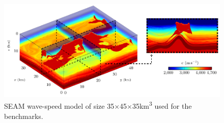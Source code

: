 %

\begin{figure}[ht!]\centering
\includegraphics[scale=0.65]{graphics/hawen/skeleton_3D_seam}
\caption{SEAM wave-speed model of size \num{35}$\times$\num{45}$\times$\num{35}\si{\km\cubed} 
         used for the benchmarks.}
\label{figure:hawen:seam-model}
\end{figure}


